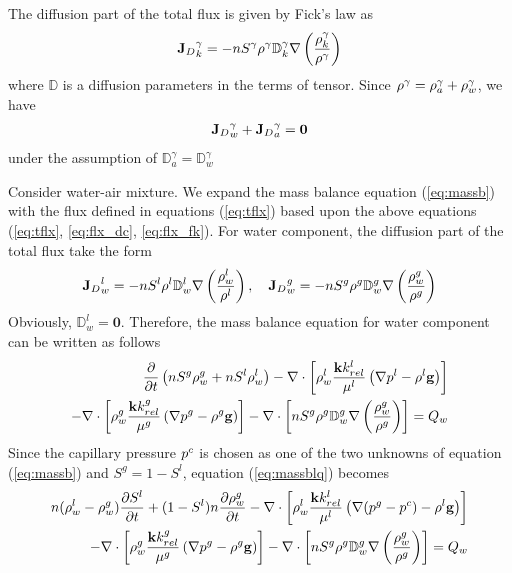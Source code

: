The diffusion part of the total flux is given by Fick's law as
\begin{align}
{{\mathbf{J}}_D}_k^{\gamma}=-n S^{\gamma}  \rho^{\gamma} {\mathbb D}_k^{\gamma} \nabla \left(\dfrac{\rho_k^{\gamma}}{\rho^{\gamma}}\right)
\label{eq:flx_fk}
\end{align}
where $\mathbb D$ is a diffusion parameters in the terms of tensor.
Since $\rho^{\gamma} = \rho_a^{\gamma}+\rho_w^{\gamma}$, we have
 \begin{align}
{{\mathbf{J}}_D}_w^{\gamma}+{{\mathbf{J}}_D}_a^{\gamma}=\mathbf 0
\label{eq:dufblc}
\end{align}
under the assumption of ${\mathbb D}_a^{\gamma}  = {\mathbb D}_w^{\gamma} $

Consider water-air mixture. We expand the mass balance equation (\ref{eq:massb}) with the flux defined in equations (\ref{eq:tflx}) based upon the above equations (\ref{eq:tflx}, \ref{eq:flx_dc}, \ref{eq:flx_fk}). For water component, the diffusion part of the total flux take the form
\begin{align}
{{\mathbf{J}}_D}_w^{l}=-n S^{l}  \rho^{l} {\mathbb D}_w^{l} \nabla \left(\dfrac{\rho_w^{l}}{\rho^{l}}\right),\quad
{{\mathbf{J}}_D}_w^{g}=-n S^{g}  \rho^{g} {\mathbb D}_w^{g} \nabla \left(\dfrac{\rho_w^{g}}{\rho^{g}}\right)
\label{eq:flx_fkw}
\end{align}
Obviously, ${\mathbb D}_w^{l} = \mathbf 0$. Therefore, the mass balance equation for water component can be written as follows
\begin{align}
\dfrac{\partial }{\partial t} \left(n S^g\rho_w^g+n S^l\rho_w^l\right)-
\nabla \cdot \left[\rho_w^{l}\dfrac{\mathbf k k_{rel}^{l}}{\mu^{l}}\left(\nabla p^{l}-\rho^{l} \mathbf g\right)\right]\nonumber\\
-\nabla \cdot \left[\rho_w^{g}\dfrac{\mathbf k k_{rel}^{g}}{\mu^{g}}\left(\nabla p^{g}-\rho^{g} \mathbf g\right)\right] -
\nabla \cdot \left[n S^{g}  \rho^{g} {\mathbb D}_w^{g} \nabla \left(\dfrac{\rho_w^{g}}{\rho^{g}}\right)\right] = Q_w
\label{eq:massblq}
\end{align}
Since the capillary pressure $p^c$  is chosen as one of the two unknowns of equation (\ref{eq:massb}) and $S^g=1-S^l$, equation (\ref{eq:massblq}) becomes
\begin{align}
n (\rho_w^l -\rho_w^g)\dfrac{\partial S^l}{\partial t} +(1 -S^l)n \dfrac{\partial \rho_w^{g}}{\partial t} -
\nabla \cdot \left[\rho_w^{l}\dfrac{\mathbf k k_{rel}^{l}}{\mu^{l}}\left(\nabla (p^{g}-p^{c}) -\rho^{l} \mathbf g\right)\right]\nonumber\\
-\nabla \cdot \left[\rho_w^{g}\dfrac{\mathbf k k_{rel}^{g}}{\mu^{g}}\left(\nabla p^{g}-\rho^{g} \mathbf g\right)\right] -
\nabla \cdot \left[n S^{g}  \rho^{g} {\mathbb D}_w^{g} \nabla \left(\dfrac{\rho_w^{g}}{\rho^{g}}\right)\right] = Q_w
\label{eq:msblq}
\end{align}
